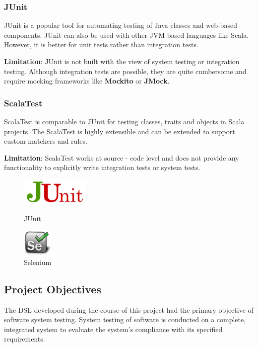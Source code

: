 \subsubsection{JUnit}
JUnit is a popular tool for automating testing of Java classes and web-based components. JUnit can also be used with other JVM based languages like Scala. However, it is better for unit tests rather than integration tests.
\bigskip

\noindent
\textbf{Limitation}: JUnit is not built with the view of system testing or integration testing. Although integration tests are possible, they are quite cumbersome and require mocking frameworks like \textbf{Mockito} or \textbf{JMock}.
\bigskip

\subsubsection{ScalaTest} 
ScalaTest is comparable to JUnit for testing classes, traits and objects in Scala projects. The ScalaTest is highly extensible and can be extended to support custom matchers and rules.
\bigskip

\noindent
\textbf{Limitation}: ScalaTest works at source - code level and does not provide any functionality to explicitly write integration tests or system tests. 
\bigskip

\begin{figure}[ht]
\centering
\quad
\begin{minipage}[b]{0.45\linewidth}
\includegraphics[height=50px]{figures/junit_logo.png}
\caption{JUnit}
\label{fig:minipage2}
\end{minipage}
\begin{minipage}[b]{0.45\linewidth}
\includegraphics[height=50px]{figures/selenium_logo.png}
\caption{Selenium}
\label{fig:minipage2}
\end{minipage}
\end{figure}

\newpage
\subsection{Project Objectives}
The DSL developed during the course of this project had the primary objective of software system testing. System testing of software is conducted on a complete, integrated system to evaluate the system's compliance with its specified requirements.
\bigskip

